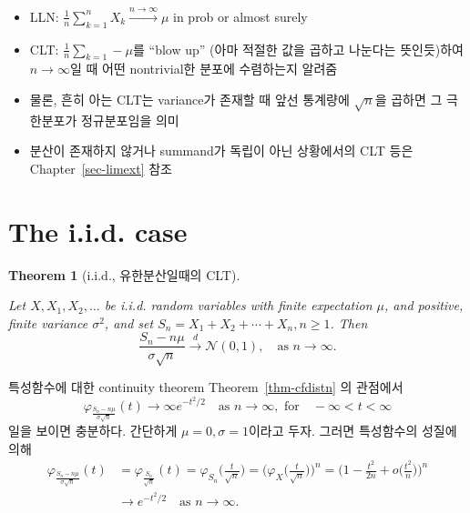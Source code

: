 \documentclass[
  13pt,
  letterpaper,
  DIV=11,
  numbers=noendperiod]{scrreprt}
\theoremstyle{definition}
\theoremstyle{plain}
\theoremstyle{definition}
\theoremstyle{plain}
\newtheorem{theorem}{Theorem}[chapter]
\theoremstyle{plain}
\theoremstyle{definition}
\theoremstyle{remark}
\begin{document}
\begin{itemize}
\item
  LLN:
  \(\frac{1}{n}\sum_{k=1}^n X_k \stackrel{n\rightarrow\infty}{\longrightarrow} \mu\)
  in prob or almost surely
\item
  CLT: \(\frac{1}{n}\sum_{k=1}-\mu\)를 ``blow up'' (아마 적절한 값을
  곱하고 나눈다는 뜻인듯)하여 \(n\rightarrow \infty\)일 때 어떤
  nontrivial한 분포에 수렴하는지 알려줌
\item
  물론, 흔히 아는 CLT는 variance가 존재할 때 앞선 통계량에
  \(\sqrt{n}\)을 곱하면 그 극한분포가 정규분포임을 의미
\item
  분산이 존재하지 않거나 summand가 독립이 아닌 상황에서의 CLT 등은
  Chapter~\ref{sec-limext} 참조
\end{itemize}

\section{The i.i.d. case}\label{the-i.i.d.-case}

\begin{theorem}[i.i.d., 유한분산일때의
CLT]\protect\hypertarget{thm-clt}{}\label{thm-clt}

Let \(X, X_1, X_2, \ldots\) be i.i.d. random variables with finite
expectation \(\mu\), and positive, finite variance \(\sigma^2\), and set
\(S_n = X_1 + X_2 + \cdots + X_n, n\geq 1\). Then \[
\frac{S_n - n\mu}{\sigma \sqrt{n}} \stackrel{d}{\rightarrow}\mathcal{N}(0,1), \quad{} \text{as }n \rightarrow\infty.
\]

\end{theorem}

\begin{tcolorbox}[enhanced jigsaw, colframe=quarto-callout-note-color-frame, bottomtitle=1mm, opacitybacktitle=0.6, breakable, leftrule=.75mm, title=\textcolor{quarto-callout-note-color}{\faInfo}\hspace{0.5em}{Proof}, colback=white, toprule=.15mm, toptitle=1mm, opacityback=0, arc=.35mm, rightrule=.15mm, bottomrule=.15mm, left=2mm, titlerule=0mm, coltitle=black, colbacktitle=quarto-callout-note-color!10!white]

특성함수에 대한 continuity theorem Theorem~\ref{thm-cfdistn} 의 관점에서
\[
\varphi_{\frac{S_n - n\mu}{\sigma \sqrt{n}}} (t) \rightarrow \infty e^{-t^2/2} \quad{} \text{as }n \rightarrow\infty, \text{ for} \quad{} -\infty < t < \infty
\] 일을 보이면 충분하다. 간단하게 \(\mu=0, \sigma=1\)이라고 두자. 그러면
특성함수의 성질에 의해 \[
\begin{align*}
\varphi_{\frac{S_n - n\mu}{\sigma \sqrt{n}}} (t) &=\varphi_{\frac{S_n }{\sqrt{n}}} (t) = \varphi_{S_n}\Big( \frac{t}{\sqrt{n}} \Big) = \Big( \varphi_X \Big( \frac{t}{\sqrt{n}}\Big)\Big)^n = \Big( 1- \frac{t^2}{2n} + o\Big( \frac{t^2}{n}\Big) \Big)^n\\
&\rightarrow e^{-t^2/2} \quad{} \text{as }n \rightarrow\infty.
\end{align*}
\]

\end{tcolorbox}
\end{document}
